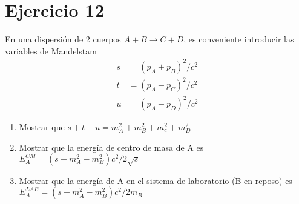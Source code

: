\section*{Ejercicio 12}
En una dispersión de 2 cuerpos $A+B \rightarrow C+D$, es conveniente introducir las variables de Mandelstam 
\begin{align*}
    s&=(p_A+p_B)^2/c^2 \\
    t&=(p_A-p_C)^2/c^2 \\
    u&= (p_A-p_D)^2/c^2
\end{align*}
\begin{enumerate}
    \item Mostrar que $s+t+u=m_A^2+m_B^2+m_c^2+m_D^2$
    \item Mostrar que la energía de centro de masa de A es $E_A^{CM}=(s+m_A^2-m_B^2)c^2/2\sqrt{s}$
    \item Mostrar que la energía de A en el sistema de laboratorio (B en reposo) es $E_A^{LAB}=(s-m_A^2-m_B^2)c^2/2m_B$
\end{enumerate}